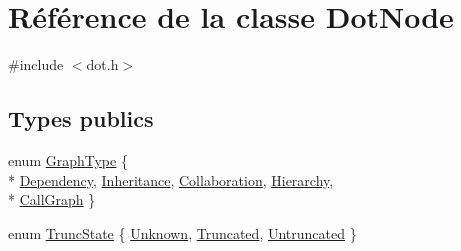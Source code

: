 \hypertarget{class_dot_node}{}\section{Référence de la classe Dot\+Node}
\label{class_dot_node}


{\ttfamily \#include $<$dot.\+h$>$}

\subsection*{Types publics}
\begin{DoxyCompactItemize}
\item 
enum \hyperlink{class_dot_node_ac4e8b27d54919cd0afa73f4c8c7d569c}{Graph\+Type} \{ \\*
\hyperlink{class_dot_node_ac4e8b27d54919cd0afa73f4c8c7d569cabb3be8d693e4274d207cdb45eac20ca2}{Dependency}, 
\hyperlink{class_dot_node_ac4e8b27d54919cd0afa73f4c8c7d569ca40518736a0d5d46809db086eee3a4a82}{Inheritance}, 
\hyperlink{class_dot_node_ac4e8b27d54919cd0afa73f4c8c7d569ca19b481e4bbe6c17e787b7f5f66e9f42c}{Collaboration}, 
\hyperlink{class_dot_node_ac4e8b27d54919cd0afa73f4c8c7d569ca2e066f7dbc9925d9bf1ff1f1ef480bd6}{Hierarchy}, 
\\*
\hyperlink{class_dot_node_ac4e8b27d54919cd0afa73f4c8c7d569ca34689b602d16486a167dd72460d41eab}{Call\+Graph}
 \}
\item 
enum \hyperlink{class_dot_node_ac40de94762a7659599b2056942373102}{Trunc\+State} \{ \hyperlink{class_dot_node_ac40de94762a7659599b2056942373102adba69679a9bcc9333c7165d4e7bdade0}{Unknown}, 
\hyperlink{class_dot_node_ac40de94762a7659599b2056942373102a4bb6a5a03b3707d0819d9c4023b516cd}{Truncated}, 
\hyperlink{class_dot_node_ac40de94762a7659599b2056942373102aa2b953f9ab3592ebf7903ff35643eb60}{Untruncated}
 \}
\end{DoxyCompactItemize}
